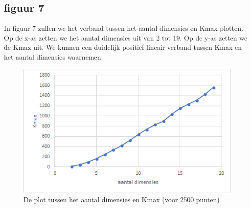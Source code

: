 \documentclass[12pt]{article}
\begin{document}
\subsection{figuur 7}

In figuur 7 zullen we het verband tussen het aantal dimensies en Kmax plotten.
Op de x-as zetten we het aantal dimensies uit van 2 tot 19.
Op de y-as zetten we de Kmax uit.
We kunnen een duidelijk positief lineair verband tussen Kmax en het aantal dimensies waarnemen.

\begin{figure}
\includegraphics[width=\textwidth]{dim-Kmax.png}
\caption{De plot tussen het aantal dimensies en Kmax (voor 2500 punten)}
\end{figure}
\end{document}
